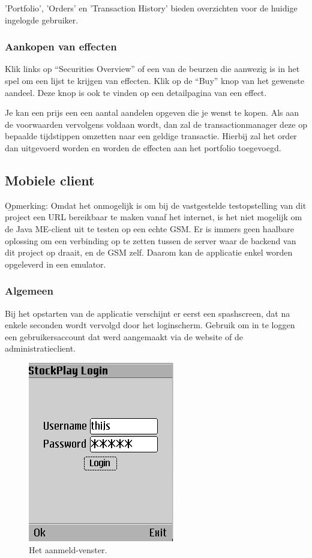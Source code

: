 'Portfolio', 'Orders' en 'Transaction History' bieden overzichten voor de huidige ingelogde gebruiker.

\subsubsection{Aankopen van effecten}

Klik links op ``Securities Overview'' of een van de beurzen die aanwezig is in het spel om een lijst te krijgen van effecten. Klik op de ``Buy'' knop van het gewenste aandeel. Deze knop is ook te vinden op een detailpagina van een effect.

Je kan een prijs een een aantal aandelen opgeven die je wenst te kopen. Als aan de voorwaarden vervolgens voldaan wordt, dan zal de transactionmanager deze op bepaalde tijdstippen omzetten naar een geldige transactie. Hierbij zal het order dan uitgevoerd worden en worden de effecten aan het portfolio toegevoegd.

\subsection{Mobiele client}

\b{Opmerking: } Omdat het onmogelijk is om bij de vastgestelde testopstelling van dit project een URL bereikbaar te maken vanaf het internet, is het niet mogelijk om de Java ME-client uit te testen op een echte GSM. Er is immers geen haalbare oplossing om een verbinding op te zetten tussen de server waar de backend van dit project op draait, en de GSM zelf. Daarom kan de applicatie enkel worden opgeleverd in een emulator.

\subsubsection{Algemeen}
Bij het opstarten van de applicatie verschijnt er eerst een spashscreen, dat na enkele seconden wordt vervolgd door het loginscherm. Gebruik om in te loggen een gebruikersaccount dat werd aangemaakt via de website of de administratieclient.
\begin{figure}[h!]
	\centering
		\includegraphics[scale=0.75]{images/handleiding/mobile/Login}
	\caption{Het aanmeld-venster.}
	\label{fig:handl:admin:login}
\end{figure}

